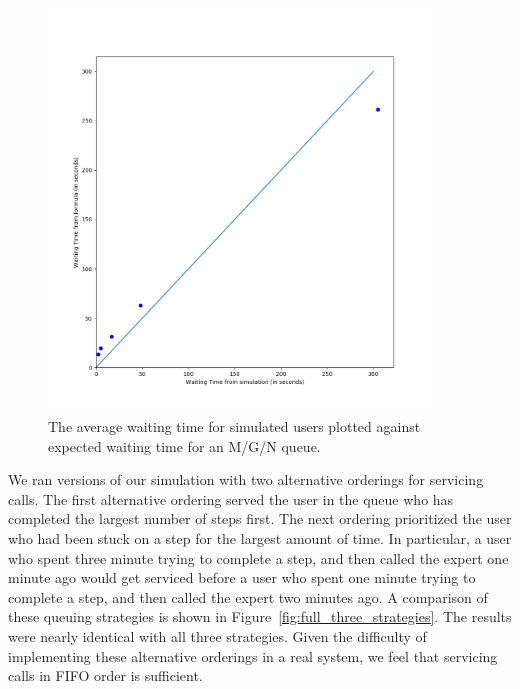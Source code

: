 \begin{figure}[h]
  \includegraphics[width=4in]{figures/montecarlo/gof.png}
  \caption{
    The average waiting time for simulated users plotted against expected
    waiting time for an M/G/N queue.
  }\label{fig:gof}
\end{figure}

We ran versions of our simulation with two alternative orderings for servicing
calls.
The first alternative ordering served the user in the queue who has completed
the largest number of steps first.
The next ordering prioritized the user who had been stuck on a step for the
largest amount of time.
In particular, a user who spent three minute trying to complete a step, and then
called the expert one minute ago would get serviced before a user who spent one
minute trying to complete a step, and then called the expert two minutes ago.
A comparison of these queuing strategies is shown in
Figure~\ref{fig:full_three_strategies}.
The results were nearly identical with all three strategies.
Given the difficulty of implementing these alternative orderings in a real
system, we feel that servicing calls in FIFO order is sufficient.

